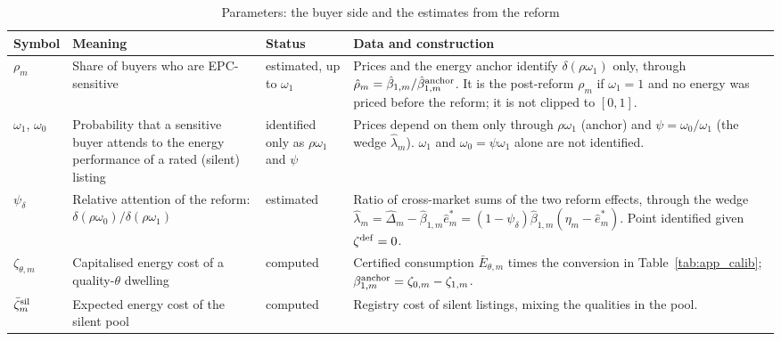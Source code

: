 \begin{table}[htbp]
\centering
\caption{Parameters: the buyer side and the estimates from the reform}
\label{tab:app_buyer}
\footnotesize\renewcommand{\arraystretch}{1.25}
\begin{tabular}{@{}llll@{}}
\toprule\toprule
\textbf{Symbol} & \textbf{Meaning} & \textbf{Status} & \textbf{Data and construction} \\
\midrule
\parbox[t]{.09\textwidth}{\raggedright $\rho_m$} & \parbox[t]{.30\textwidth}{\raggedright Share of buyers who are EPC-sensitive} & \parbox[t]{.14\textwidth}{\raggedright estimated, up to $\omega_1$} & \parbox[t]{.37\textwidth}{\raggedright Prices and the energy anchor identify $\delta(\rho\omega_1)$ only, through $\hat\rho_m=\hat\beta_{1,m}/\hat\beta^{\rm anchor}_{1,m}$. It is the post-reform $\rho_m$ if $\omega_1=1$ and no energy was priced before the reform; it is not clipped to $[0,1]$.} \\[12pt]
\parbox[t]{.09\textwidth}{\raggedright $\omega_1$, $\omega_0$} & \parbox[t]{.30\textwidth}{\raggedright Probability that a sensitive buyer attends to the energy performance of a rated (silent) listing} & \parbox[t]{.14\textwidth}{\raggedright identified only as $\rho\omega_1$ and $\psi$} & \parbox[t]{.37\textwidth}{\raggedright Prices depend on them only through $\rho\omega_1$ (anchor) and $\psi=\omega_0/\omega_1$ (the wedge $\hat\lambda_m$). $\omega_1$ and $\omega_0=\psi\omega_1$ alone are not identified.} \\[12pt]
\parbox[t]{.09\textwidth}{\raggedright $\psi_\delta$} & \parbox[t]{.30\textwidth}{\raggedright Relative attention of the reform: $\delta(\rho\omega_0)/\delta(\rho\omega_1)$} & \parbox[t]{.14\textwidth}{\raggedright estimated} & \parbox[t]{.37\textwidth}{\raggedright Ratio of cross-market sums of the two reform effects, through the wedge $\hat\lambda_m=\hat\Delta_m-\hat\beta_{1,m}\hat e^*_m=(1-\psi_\delta)\hat\beta_{1,m}(\eta_m-\hat e^*_m)$. Point identified given $\zeta^{\rm def}=0$.} \\[12pt]
\parbox[t]{.09\textwidth}{\raggedright $\zeta_{\theta,m}$} & \parbox[t]{.30\textwidth}{\raggedright Capitalised energy cost of a quality-$\theta$ dwelling} & \parbox[t]{.14\textwidth}{\raggedright computed} & \parbox[t]{.37\textwidth}{\raggedright Certified consumption $\bar E_{\theta,m}$ times the conversion in Table~\ref{tab:app_calib}; $\beta^{\rm anchor}_{1,m}=\zeta_{0,m}-\zeta_{1,m}$.} \\[12pt]
\parbox[t]{.09\textwidth}{\raggedright $\bar\zeta^{\rm sil}_m$} & \parbox[t]{.30\textwidth}{\raggedright Expected energy cost of the silent pool} & \parbox[t]{.14\textwidth}{\raggedright computed} & \parbox[t]{.37\textwidth}{\raggedright Registry cost of silent listings, mixing the qualities in the pool.} \\[12pt]

\end{tabular}
\end{table}

